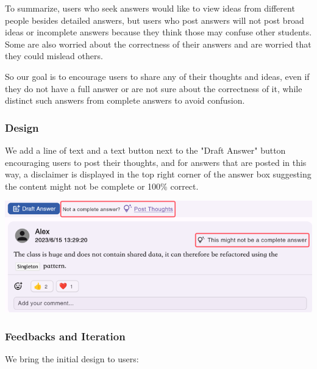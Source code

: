 \documentclass[a4paper]{article}
\begin{document}
    To summarize, users who seek answers would like to view ideas from different people besides detailed answers,
    but users who post answers will not post broad ideas or incomplete answers because they think those may confuse other students.
    Some are also worried about the correctness of their answers and are worried that they could mislead others.

    So our goal is to encourage users to share any of their thoughts and ideas, even if they do not have a full answer
    or are not sure about the correctness of it, while distinct such answers from complete answers to avoid confusion.

    \subsubsection*{Design}
    We add a line of text and a text button next to the "Draft Answer" button encouraging users to post their thoughts,
    and for answers that are posted in this way, a disclaimer is displayed in the top right corner of the answer box
    suggesting the content might not be complete or 100\% correct.

    \noindent \includegraphics[width=\textwidth]{thought1}

    \subsubsection*{Feedbacks and Iteration}
    \noindent We bring the initial design to users:
\end{document}
